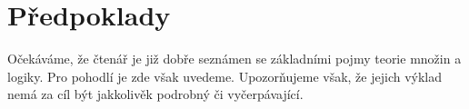 \chapter{Předpoklady}
\label{chap:predpoklady}

Očekáváme, že čtenář je již dobře seznámen se základními pojmy teorie množin a
logiky. Pro pohodlí je zde však uvedeme. Upozorňujeme však, že jejich výklad
nemá za cíl být jakkolivěk podrobný či vyčerpávající.



